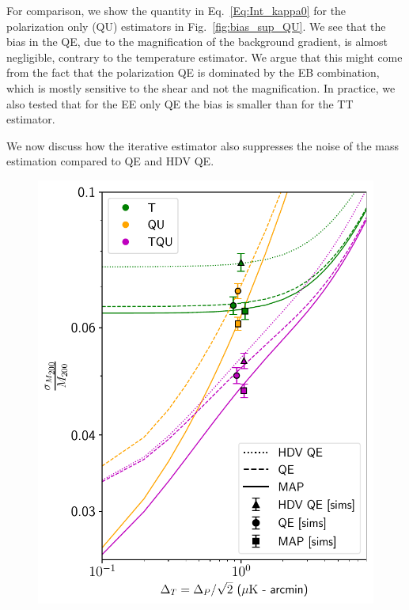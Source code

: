 \documentclass[prd, superscriptaddress, tightenlines, longbibliography, nofootinbib, eqsecnum, amsfonts, amsmath, floatfix, twocolumn, notitlepage]{revtex4-2}
\begin{document}
For comparison, we show the quantity in Eq.~\ref{Eq:Int_kappa0} for the polarization only (QU) estimators in Fig.~\ref{fig:bias_sup_QU}. We see that the bias in the QE, due to the magnification of the background gradient, is almost negligible, contrary to the temperature estimator. We argue that this might come from the fact that the polarization QE is dominated by the EB combination, which is mostly sensitive to the shear and not the magnification. In practice, we also tested that for the EE only QE the bias is smaller than for the TT estimator. 

We now discuss how the iterative estimator also suppresses the noise of the mass estimation compared to QE and HDV QE.
\begin{figure}
	\centering
	\hspace{-1.2cm}
	\includegraphics[width=1.\hsize]{Figures/forcast_snr_ver2.pdf}

\end{figure}
\end{document}
